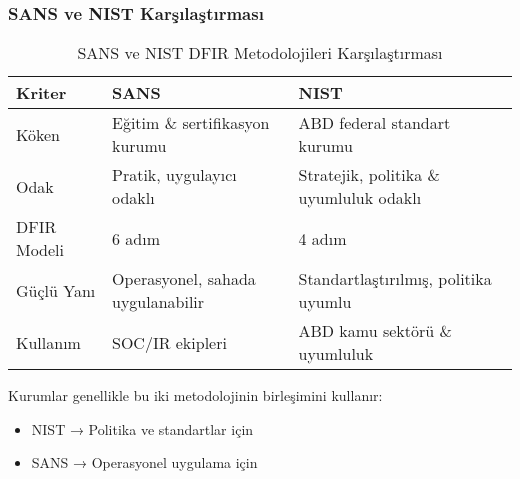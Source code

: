 \subsubsection{SANS ve NIST Karşılaştırması}

\begin{table}[h]
\centering
\begin{tabular}{|l|l|l|}
\hline
\textbf{Kriter} & \textbf{SANS} & \textbf{NIST} \\
\hline
Köken & Eğitim \& sertifikasyon kurumu & ABD federal standart kurumu \\
\hline
Odak & Pratik, uygulayıcı odaklı & Stratejik, politika \& uyumluluk odaklı \\
\hline
DFIR Modeli & 6 adım & 4 adım \\
\hline
Güçlü Yanı & Operasyonel, sahada uygulanabilir & Standartlaştırılmış, politika uyumlu \\
\hline
Kullanım & SOC/IR ekipleri & ABD kamu sektörü \& uyumluluk \\
\hline
\end{tabular}
\caption{SANS ve NIST DFIR Metodolojileri Karşılaştırması}
\end{table}

Kurumlar genellikle bu iki metodolojinin birleşimini kullanır:
\begin{itemize}
    \item NIST → Politika ve standartlar için
    \item SANS → Operasyonel uygulama için
\end{itemize}

